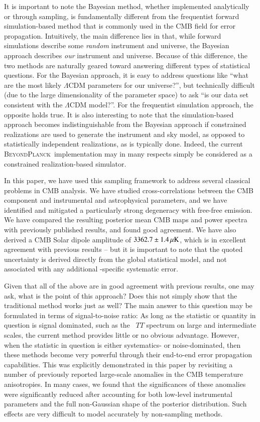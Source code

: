 \documentclass[twocolumn]{aa}
\newcommand{\red}[0]{\color{red}}
\newcommand{\BP}{\textsc{BeyondPlanck}}
\begin{document}
It is important to note the Bayesian method, whether implemented
analytically or through sampling, is fundamentally different from the
frequentist forward simulation-based method that is commonly used in
the CMB field for error propagation. Intuitively, the main difference
lies in that, while forward simulations describe some \emph{random}
instrument and universe, the Bayesian approach describes \emph{our}
instrument and universe. Because of this difference, the two methods
are naturally geared toward answering different types of statistical
questions. For the Bayesian approach, it is easy to address questions
like ``what are the most likely $\Lambda$CDM parameters for our
universe?'', but {\red technically} difficult {\red (due to the large dimensionality of the parameter space)} to ask ``is our data set consistent with
the $\Lambda$CDM model?''. For the frequentist simulation approach,
the opposite holds true. It is also interesting to note that the
simulation-based approach becomes indistinguishable from the Bayesian
approach if constrained realizations are used to generate the
instrument and sky model, as opposed to statistically independent
realizations, as is typically done. Indeed, the current
\BP\ implementation may in many respects simply be considered as a
constrained realization-based simulator.

In this paper, we have used this sampling framework to address several
classical problems in CMB analysis. We have studied cross-correlations
between the CMB component and instrumental and astrophysical
parameters, and we have identified and mitigated a particularly strong
degeneracy with free-free emission. We have compared the resulting
posterior mean CMB maps and power spectra with previously published
results, and found good agreement. We have also derived a CMB Solar
dipole amplitude of $3362.7\pm1.4\muK$, which is in excellent
agreement with previous results -- but it is important to note that
the quoted uncertainty is derived directly from the global statistical
model, and not associated with any additional \Planck-specific
systematic error.

Given that all of the above are in good agreement with previous
results, one may ask, what is the point of this approach? Does this
not simply show that the traditional method works just as well? The
main answer to this question may be formulated in terms of
signal-to-noise ratio: As long as the statistic or quantity in
question is signal dominated, such as the \Planck\ $TT$ spectrum on
large and intermediate scales, the current method provides little or
no obvious advantage. However, when the statistic in question is
either systematics- or noise-dominated, then these methods become very
powerful through their end-to-end error propagation capabilities. This
was explicitly demonstrated in this paper by revisiting a number of
previously reported large-scale anomalies in the CMB temperature
anisotropies. In many cases, we found that the significances of these
anomalies were significantly reduced after accounting for both
low-level instrumental parameters and the full non-Gaussian shape of
the posterior distribution. Such effects are very difficult to model
accurately by non-sampling methods.
\end{document}
